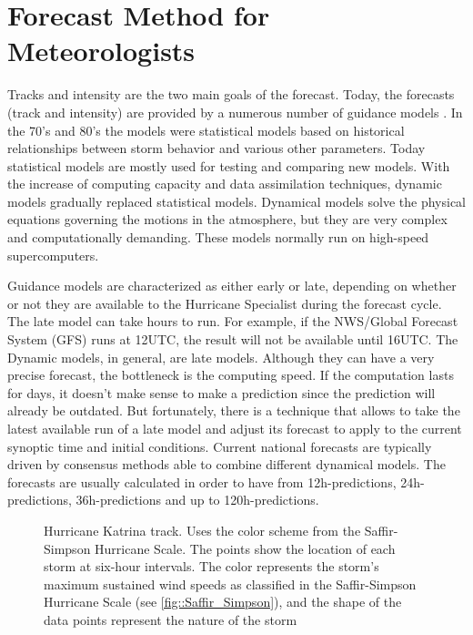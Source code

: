 \section{Forecast Method for Meteorologists}
Tracks and intensity are the two main goals of the forecast. Today, the forecasts (track and intensity) are provided by a numerous number of guidance models \cite{nhc_models}. In the 70's and 80's the models were statistical models based on historical relationships between storm behavior and various other parameters\cite{demaria2005further}. Today statistical models are mostly used for testing and comparing new models. With the increase of computing capacity and data assimilation techniques, dynamic models gradually replaced statistical models. Dynamical models solve the physical equations governing the motions in the atmosphere, but they are very complex and computationally demanding. These models normally run on high-speed supercomputers. 

Guidance models are characterized as either early or late, depending on whether or not they are available to the Hurricane Specialist during the forecast cycle. \cite{nhc_models} The late model can take hours to run. For example, if the NWS/Global Forecast System (GFS) runs at 12UTC, the result will not be available until 16UTC. The Dynamic models, in general, are late models. Although they can have a very precise forecast, the bottleneck is the computing speed. If the computation lasts for days, it doesn't make sense to make a prediction since the prediction will already be outdated. But fortunately, there is a technique that allows to take the latest available run of a late model and adjust its forecast to apply to the current synoptic time and initial conditions\cite{nhc_models}. Current national forecasts are typically driven by consensus methods able to combine different dynamical models. The forecasts are usually calculated in order to have from 12h-predictions, 24h-predictions, 36h-predictions and up to 120h-predictions. 

\begin{figure}[t]
	\begin{center}
		\hsize {}
	\end{center}
	\caption{Hurricane Katrina track. Uses the color scheme from the Saffir-Simpson Hurricane Scale. The points show the location of each storm at six-hour intervals. The color represents the storm's maximum sustained wind speeds as classified in the Saffir-Simpson Hurricane Scale (see \ref{fig::Saffir_Simpson}), and the shape of the data points represent the nature of the storm \cite{katrina_track}}
	\label{fig:Katrina}
\end{figure}

